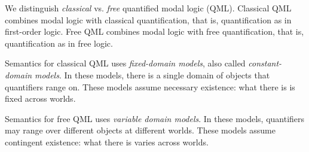 \documentclass[../../../include/open-logic-section]{subfiles}
\begin{document}


We distinguish \emph{classical} vs. \emph{free} quantified
modal logic (QML). Classical QML combines modal logic with 
classical quantification, that is, quantification as 
in first-order logic. Free QML combines modal logic with 
free quantification, that is, quantification as in free logic.

Semantics for classical QML uses \emph{fixed-domain models},
also called \emph{constant-domain models}. 
In these models, there is a single domain of objects that 
quantifiers range on. These models assume necessary existence: 
what there is is fixed across worlds.

Semantics for free QML uses \emph{variable domain models}.
In these models, quantifiers may range over different objects
at different worlds. These models assume contingent existence: 
what there is varies across worlds.
\end{document}
